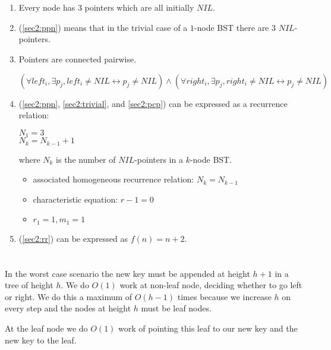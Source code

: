 \documentclass[12pt, a4paper]{article}
\begin{document}
\section{} %
\begin{enumerate}
	\item Every node has $3$ pointers which are all initially $NIL$.
	\label{sec2:ppn}

	\item (\ref{sec2:ppn}) means that in the trivial case of a $1$-node BST there are $3$ $NIL$-pointers.
	\label{sec2:trivial}

	\item Pointers are connected pairwise.

	$(\forall left_i, \exists p_j, left_i \neq NIL \leftrightarrow p_j \neq NIL) \land (\forall right_i, \exists p_j, right_i \neq NIL \leftrightarrow p_j \neq NIL)$
	\label{sec2:pcp}

	\item (\ref{sec2:ppn}, \ref{sec2:trivial}, and \ref{sec2:pcp}) can be expressed as a recurrence relation:

	$N_1 = 3$\\
	$N_k = N_{k - 1} + 1$

	where $N_k$ is the number of $NIL$-pointers in a $k$-node BST.

	\begin{itemize}
		\item associated homogeneous recurrence relation: $N_k = N_{k - 1}$
		\item characteristic equation: $r - 1 = 0$
		\item $r_1 = 1, m_1 = 1$
	\end{itemize}
	\label{sec2:rr}

	\item (\ref{sec2:rr}) can be expressed as $f(n) = n + 2$.
\end{enumerate}

\section{} %
In the worst case scenario the new key must be appended at height $h+1$ in a tree of height $h$. We do $O(1)$ work at non-leaf node, deciding whether to go left or right. We do this a maximum of $O(h - 1)$ times because we increase $h$ on every step and the nodes at height $h$ must be leaf nodes.

At the leaf node we do $O(1)$ work of pointing this leaf to our new key and the new key to the leaf.
\end{document}
